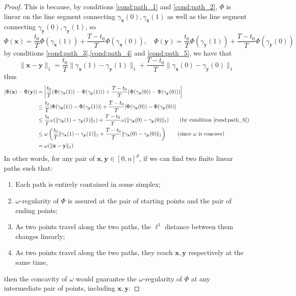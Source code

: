 \documentclass{article}
\numberwithin{equation}{section}
\theoremstyle{definition}
\begin{document}
\begin{proof}
This is because, by conditions \ref{cond:path_1} and \ref{cond:path_2}, $\Phi$ is linear on the line segment connecting $\gamma_{\mathbf{x}}(0),\gamma_{\mathbf{x}}(1)$ as well as the line segment connecting $\gamma_{\mathbf{y}}(0),\gamma_{\mathbf{y}}(1)$, so
$$\Phi(\mathbf{x}) = 
\frac{t_0}{T} \Phi(\gamma_{\mathbf{x}}(1)) + 
\frac{T-t_0}{T} \Phi(\gamma_{\mathbf{x}}(0)), 
\quad
\Phi(\mathbf{y}) = 
\frac{t_0}{T} \Phi(\gamma_{\mathbf{y}}(1)) + 
\frac{T-t_0}{T} \Phi(\gamma_{\mathbf{y}}(0)) $$
by conditions \ref{cond:path_3},\ref{cond:path_4} and \ref{cond:path_5}, we have that 
$$\| \mathbf{x} - \mathbf{y} \|_1 = 
\frac{t_0}{T} \|\gamma_{\mathbf{x}}(1) - \gamma_{\mathbf{y}}(1)\|_1
+ 
\frac{T-t_0}{T} \|\gamma_{\mathbf{x}}(0) - \gamma_{\mathbf{y}}(0)\|_1$$
thus
\begin{align*}
    |\Phi(\mathbf{x}) - \Phi(\mathbf{y})| 
    &= \left| \frac{t_0}{T} 
              ( \Phi(\gamma_{\mathbf{x}}(1)) - 
              \Phi(\gamma_{\mathbf{y}}(1)) ) 
              +
              \frac{T-t_0}{T} 
              ( \Phi(\gamma_{\mathbf{x}}(0)) - \Phi(\gamma_{\mathbf{y}}(0)) ) 
        \right|  \\
    &\le \frac{t_0}{T} 
         | \Phi(\gamma_{\mathbf{x}}(1)) - \Phi(\gamma_{\mathbf{y}}(1)) |
         +
         \frac{T-t_0}{T} 
         | \Phi(\gamma_{\mathbf{x}}(0)) - \Phi(\gamma_{\mathbf{y}}(0)) |  \\
    &\le \frac{t_0}{T} 
         \omega(\|\gamma_{\mathbf{x}}(1) - \gamma_{\mathbf{y}}(1)\|_1)
         +
         \frac{T-t_0}{T} 
         \omega(\|\gamma_{\mathbf{x}}(0) - \gamma_{\mathbf{y}}(0)\|_1)  \tag{by condition \ref{cond:path_6}}  \\
    &\le \omega
         \left( \frac{t_0}{T} 
                \|\gamma_{\mathbf{x}}(1) - \gamma_{\mathbf{y}}(1)\|_1
                + 
                \frac{T-t_0}{T} 
                \|\gamma_{\mathbf{x}}(0) - \gamma_{\mathbf{y}}(0)\|_1 
         \right)  
         \tag{since $\omega$ is concave}  \\
    &= \omega(\|\mathbf{x} - \mathbf{y}\|_1)
\end{align*}
In other words, for any pair of $\mathbf{x},\mathbf{y}\in [0,n]^d$, if we can find two finite linear paths such that:
\begin{enumerate}[label=\arabic*$'$]
    \item \label{cond:path_1'} Each path is entirely contained in some simplex;
    \item \label{cond:path_2'} $\omega$-regularity of $\Phi$ is assured at the pair of starting points and the pair of ending points;
    \item \label{cond:path_3'} As two points travel along the two paths, the $\ell^1$ distance between them changes linearly;
    \item \label{cond:path_4'} As two points travel along the two paths, they reach $\mathbf{x},\mathbf{y}$ respectively at the same time,
\end{enumerate}
then the concavity of $\omega$ would guarantee the $\omega$-regularity of $\Phi$ at any intermediate pair of points, including $\mathbf{x},\mathbf{y}$.


\end{proof}
\end{document}

